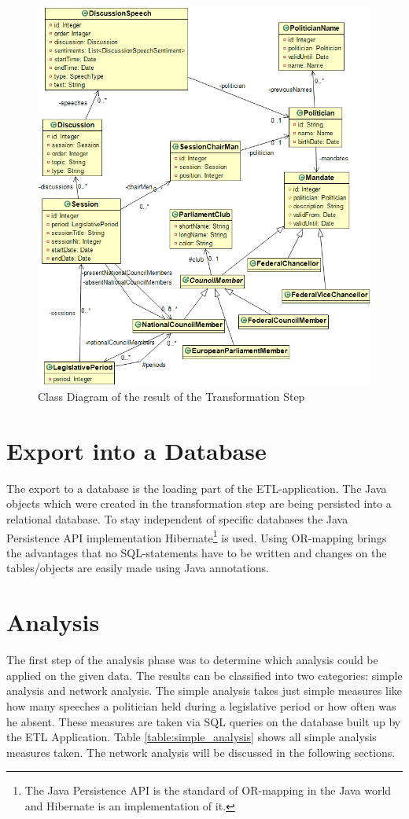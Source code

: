 \begin{figure}[h]
	\centering
	\includegraphics[width=\textwidth]{imgs/all_class_diagram}
	\caption{Class Diagram of the result of the Transformation Step}
	\label{fig:all_class_diagram}
\end{figure}


\section{Export into a Database}
\label{sec:export_db}
The export to a database is the loading part of the ETL-application. The Java objects which were created in the transformation step are being persisted into a relational database. To stay independent of specific databases the Java Persistence API implementation Hibernate\footnote{The Java Persistence API is the standard of OR-mapping in the Java world and Hibernate is an implementation of it.} is used. Using OR-mapping brings the advantages that no SQL-statements have to be written and changes on the tables/objects are easily made using Java annotations.

\section{Analysis}
\label{sec:analysis}
The first step of the analysis phase was to determine which analysis could be applied on the given data. The results can be classified into two categories: simple analysis and network analysis. The simple analysis takes just simple measures like how many speeches a politician held during a legislative period or how often was he absent. These measures are taken via SQL queries on the database built up by the ETL Application. Table \ref{table:simple_analysis} shows all simple analysis measures taken. The network analysis will be discussed in the following sections.

